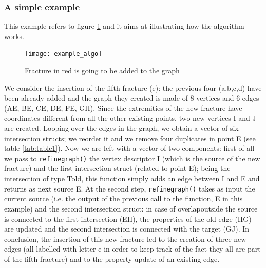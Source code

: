 \documentclass[10pt]{article} %
\begin{document}
	\subsubsection{A simple example}
	This example refers to figure \ref{fig:example_algo} and it aims at illustrating how the algorithm works.
	\begin{figure}
		\centering 
		\texttt{[image: example\_algo]}
		\caption{Fracture in red is going to be added to the graph}
		\label{fig:example_algo}
	\end{figure}
	We consider the insertion of the fifth fracture (e): the previous four (a,b,c,d) have been already added and the graph they created is made of 8 vertices and 6 edges (AE, BE, CE, DE, FE, GH).  
	Since the extremities of the new fracture have coordinates different from all the other existing points, two new vertices I and J are created. Looping over the edges in the graph, we obtain a vector of six intersection structs; we reorder it and we remove four duplicates in point E (see table \ref{tab:table1}).
	Now we are left with a vector of two components: first of all we pass to \texttt{refine\textunderscore graph()} the vertex descriptor I (which is the source of the new fracture) and the first intersection struct (related to point E); being the intersection of type T\textunderscore old, this function simply adds an edge between I and E and returns as next source E. At the second step, \texttt{refine\textunderscore graph()} takes as input the current source (i.e. the output of the previous call to the function, E in this example) and the second intersection struct: in case of overlap\textunderscore outside the source is connected to the first intersection (EH), the properties of the old edge (HG) are updated and the second intersection is connected with the target (GJ). In conclusion, the insertion of this new fracture led to the creation of three new edges (all labelled with letter e in order to keep track of the fact they all are part of the fifth fracture) and to the property update of an existing edge.
\end{document}
